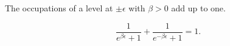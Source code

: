 \documentclass{article}
\begin{document}
The occupations of a level at $\pm\epsilon$ with $\beta>0$ add up to one.

\begin{equation}
\frac{1}{e^{\beta\epsilon}+1} + \frac{1}{e^{-\beta\epsilon}+1} = 1 .
\label{eq:new}
\end{equation}
\end{document}

